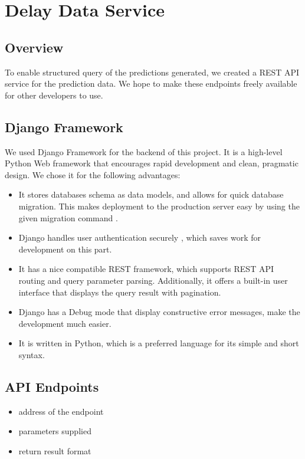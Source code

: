 \chapter{Delay Data Service}
\label{ch:data_service}
\section{Overview}
To enable structured query of the predictions generated, we created a REST API service for the prediction data. We hope to make these endpoints freely available for other developers to use.

\section{Django Framework}
\par We used Django Framework\cite{django_framework} for the backend of this project. It is a high-level Python Web framework that encourages rapid development and clean, pragmatic design. We chose it for the following advantages:

\begin{itemize}
  \item It stores databases schema as data models\cite{django_model}, and allows for quick database migration. This makes deployment to the production server easy by using the given migration command \cite{django_migrations}.
  \item Django handles user authentication securely \cite{django_user_auth}, which saves work for development on this part.
  \item It has a nice compatible REST framework\cite{django_rest}, which supports REST API routing\cite{django_rest_routing} and query parameter parsing. Additionally, it offers a built-in user interface that displays the query result with pagination\cite{django_rest_pagination}.
  \item Django has a Debug mode that display constructive error messages, make the development much easier.
  \item It is written in Python, which is a preferred language for its simple and short syntax.
\end{itemize}

\section{API Endpoints}
\begin{itemize}
  \item address of the endpoint
  \item parameters supplied
  \item return result format
\end{itemize}

